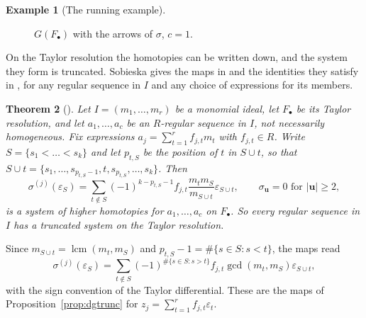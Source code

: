 \documentclass[12pt]{amsart}
\theoremstyle{plain}
\newtheorem{theorem}{Theorem}[section]
\theoremstyle{definition}
\newtheorem{example}[theorem]{Example}
\newcommand{\F}{ {F_\bullet} }
\newcommand{\lcm}{\operatorname{lcm}}
\newcommand{\eps}{\varepsilon}
\begin{document}
\begin{example}[The running example]
\begin{figure}[b]
{}
        \caption{$G(\F)$ with the arrows of $\sigma$, $c = 1$.}
        \label{fig:GsigmaTaylor}
\end{figure}

\end{example}

On the Taylor resolution the homotopies can be written down, and the system they form is truncated. Sobieska gives the maps in \cite[Def.~3.1]{Sobieska} and the identities they satisfy in \cite[Thm.~3.2]{Sobieska}, for any regular sequence in $I$ and any choice of expressions for its members.

\begin{theorem}[{\cite[Thm.~3.2]{Sobieska}}]\label{thm:sobieska}
    Let $I = (m_1, \dots, m_r)$ be a monomial ideal, let $\F$ be its Taylor resolution, and let $a_1, \dots, a_c$ be an $R$-regular sequence in $I$, not necessarily homogeneous. Fix expressions $a_j = \sum_{t=1}^{r} f_{j,t} m_t$ with $f_{j,t} \in R$. Write $S = \{s_1 < \dots < s_k\}$ and let $p_{t,S}$ be the position of $t$ in $S \cup t$, so that $S \cup t = \{s_1, \dots, s_{p_{t,S}-1}, t, s_{p_{t,S}}, \dots, s_k\}$. Then
    \[
        \sigma^{(j)}(\eps_S) = \sum_{t \notin S} (-1)^{k - p_{t,S} - 1} f_{j,t} \frac{m_t m_S}{m_{S \cup t}} \eps_{S \cup t}, \qquad \sigma_{\boldsymbol{u}} = 0 \text{ for } |\boldsymbol{u}| \ge 2,
    \]
    is a system of higher homotopies for $a_1, \dots, a_c$ on $\F$. So every regular sequence in $I$ has a truncated system on the Taylor resolution.
\end{theorem}

Since $m_{S \cup t} = \lcm(m_t, m_S)$ and $p_{t,S} - 1 = \#\{s \in S : s < t\}$, the maps read
\[
    \sigma^{(j)}(\eps_S) = \sum_{t \notin S} (-1)^{\#\{s \in S : s > t\}} f_{j,t} \gcd(m_t, m_S) \eps_{S \cup t},
\]
with the sign convention of the Taylor differential. These are the maps of Proposition~\ref{prop:dgtrunc} for $z_j = \sum_{t=1}^{r} f_{j,t} \eps_t$.
\end{document}
